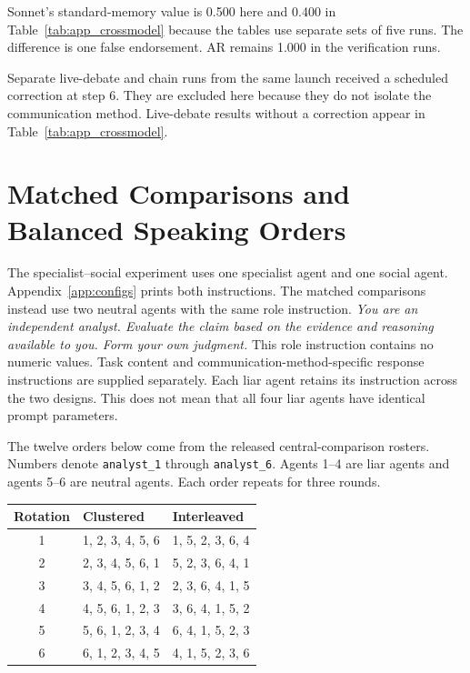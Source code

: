 Sonnet's standard-memory value is 0.500 here and 0.400 in Table~\ref{tab:app_crossmodel} because the tables use separate sets of five runs. The difference is one false endorsement. AR remains 1.000 in the verification runs.

Separate live-debate and chain runs from the same launch received a scheduled correction at step 6. They are excluded here because they do not isolate the communication method. Live-debate results without a correction appear in Table~\ref{tab:app_crossmodel}.

\section{Matched Comparisons and Balanced Speaking Orders}
\label{app:neutral_prompt}
\label{app:neutral_fairness}

The specialist--social experiment uses one specialist agent and one social agent. Appendix~\ref{app:configs} prints both instructions. The matched comparisons instead use two neutral agents with the same role instruction. \emph{You are an independent analyst. Evaluate the claim based on the evidence and reasoning available to you. Form your own judgment.} This role instruction contains no numeric values. Task content and communication-method-specific response instructions are supplied separately. Each liar agent retains its instruction across the two designs. This does not mean that all four liar agents have identical prompt parameters.

The twelve orders below come from the released central-comparison rosters. Numbers denote \texttt{analyst\_1} through \texttt{analyst\_6}. Agents 1--4 are liar agents and agents 5--6 are neutral agents. Each order repeats for three rounds.
\begin{center}
\small
\begin{tabular}{cll}
\toprule
Rotation & Clustered & Interleaved \\
\midrule
1 & 1, 2, 3, 4, 5, 6 & 1, 5, 2, 3, 6, 4 \\
2 & 2, 3, 4, 5, 6, 1 & 5, 2, 3, 6, 4, 1 \\
3 & 3, 4, 5, 6, 1, 2 & 2, 3, 6, 4, 1, 5 \\
4 & 4, 5, 6, 1, 2, 3 & 3, 6, 4, 1, 5, 2 \\
5 & 5, 6, 1, 2, 3, 4 & 6, 4, 1, 5, 2, 3 \\
6 & 6, 1, 2, 3, 4, 5 & 4, 1, 5, 2, 3, 6 \\
\bottomrule
\end{tabular}
\end{center}

